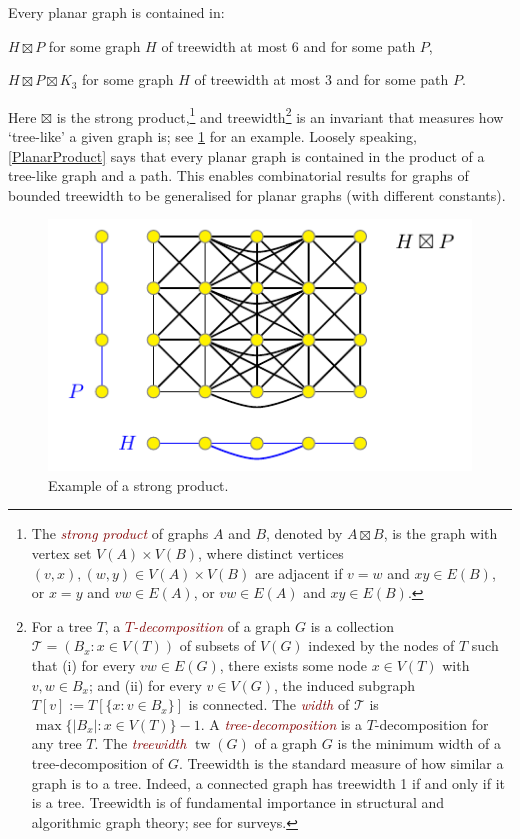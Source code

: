 \documentclass{patmorin}
\newcommand{\defin}[1]{\textcolor{Maroon}{\emph{#1}}}
\DeclareMathOperator{\tw}{tw}
\begin{document}
\begin{thm}
\label{PlanarProduct}
Every planar graph is contained in:
\begin{compactenum}[(a)]
	\item $H\boxtimes P$ for some graph $H$ of treewidth at most $6$ and for some path $P$,
	\item $H\boxtimes P \boxtimes K_3$ for some graph $H$ of treewidth at most $3$ and for some path $P$.
\end{compactenum}
\end{thm}

Here $\boxtimes$ is the strong product,\!\footnote{The \defin{strong product} of graphs $A$ and $B$, denoted by $A\boxtimes B$, is the graph with vertex set $V(A)\times V(B)$, where distinct vertices $(v,x),(w,y)\in V(A)\times V(B)$ are adjacent if
	$v=w$ and $xy\in E(B)$, or
	$x=y$ and $vw\in E(A)$, or
	$vw\in E(A)$ and $xy\in E(B)$.}
and treewidth\footnote{For a tree $T$, a \defin{$T$-decomposition} of a graph $G$ is a collection $\mathcal{T}=(B_x:x\in V(T))$ of subsets of $V(G)$ indexed by the nodes of $T$ such that
(i) for every $vw\in E(G)$, there exists some node $x\in V(T)$ with $v,w\in B_x$; and
(ii) for every $v\in V(G)$, the induced subgraph $T[v] := T[\{x: v\in B_x\}]$ is connected. The \defin{width} of $\mathcal{T}$ is $\max\{|B_x|:x\in V(T)\}-1$.  A \defin{tree-decomposition} is a $T$-decomposition for any tree $T$. The \defin{treewidth} $\tw(G)$ of a graph $G$ is the minimum width of a tree-decomposition of $G$.  Treewidth is the standard measure of how similar a graph is to a tree. Indeed, a connected graph has treewidth 1 if and only if it is a tree. Treewidth is of fundamental importance in structural and algorithmic graph theory; see \citep{Reed03,HW17,Bodlaender-TCS98} for surveys.} is an invariant that measures how `tree-like' a given graph is; see \cref{ProductExample} for an example. Loosely speaking, \cref{PlanarProduct} says that every planar graph is contained in the product of a tree-like graph and a path. This enables combinatorial results for graphs of bounded treewidth to be generalised for planar graphs (with different constants).

\begin{figure}[!h]
\centering
\includegraphics{ProductExample}
\caption{Example of a strong product.
\label{ProductExample}}
\end{figure}
\end{document}
